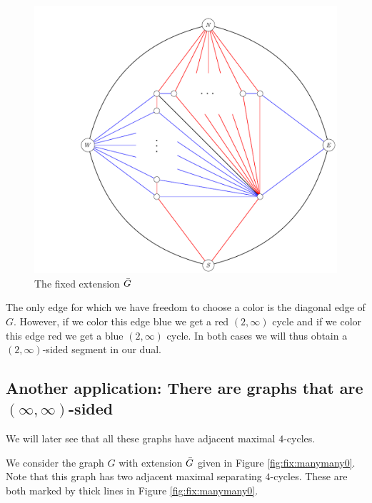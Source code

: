   \begin{figure}[h!]
  \centering
  \includegraphics[scale=.5]{fixExtension/img/2manysidedLowerBound}

  \caption{The fixed extension $\bar{G}$
      \label{fig:2manysidedLowerBound}}
  \end{figure}

  The only edge for which we have freedom to choose a color is the diagonal edge of $G$. However, if we color this edge blue we get a red $(2, \infty)$ cycle and if we color this edge red we get a blue $(2, \infty)$ cycle. In both cases we will thus obtain a $(2,\infty)$-sided segment in our dual.

\subsection{Another application: There are graphs that are $(\infty, \infty)$-sided}
  \label{ss:fix:manymany}
  We will later see that all these graphs have adjacent maximal $4$-cycles.

  We consider the graph $G$ with extension $\bar{G}$ given in Figure \ref{fig:fix:manymany0}. Note that this graph has two adjacent maximal separating $4$-cycles. These are both marked by thick lines in Figure \ref{fig:fix:manymany0}.

